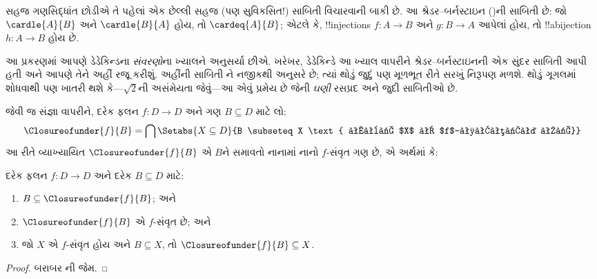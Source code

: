 \documentclass[../../../include/open-logic-section]{subfiles}
\begin{document}


સહજ ગણસિદ્ધાંત છોડીએ તે પહેલાં એક છેલ્લી સહજ (પણ સુવિકસિત!) સાબિતી
વિચારવાની બાકી છે. આ શ્રેડર--બર્નસ્ટાઇન
()ની સાબિતી છે: જો
$\cardle{A}{B}$ અને $\cardle{B}{A}$ હોય, તો $\cardeq{A}{B}$; એટલે કે,
!!{injection}s $f \colon A \to B$ અને $g \colon B \to A$ આપેલાં હોય,
તો !!a{bijection} $h \colon A \to B$ હોય છે.

આ પ્રકરણમાં આપણે ડેડેકિન્ડના \emph{સંવરણો}ના ખ્યાલને અનુસર્યા છીએ.
ખરેખર, ડેડેકિન્ડે આ ખ્યાલ વાપરીને શ્રેડર--બર્નસ્ટાઇનની એક સુંદર
સાબિતી આપી હતી અને આપણે તેને અહીં રજૂ કરીશું. અહીંની સાબિતી
\citet[pp.~157--8]{Potter2004}ને નજીકથી અનુસરે છે; ત્યાં થોડું જુદું
પણ મૂળભૂત રીતે સરખું નિરૂપણ મળશે. થોડું ગૂગલમાં
શોધવાથી પણ ખાતરી થશે કે---$\sqrt{2}$ની અસંમેયતા જેવું---આ એવું પ્રમેય
છે જેની \emph{ઘણી} રસપ્રદ અને જુદી સાબિતીઓ છે.

 જેવી જ સંજ્ઞા વાપરીને,
દરેક ફલન $f\colon D\to D$ અને ગણ $B\subseteq D$ માટે લો:
\[
\Closureofunder{f}{B} = \bigcap \Setabs{X\subseteq D}{B \subseteq X
\text{ અને $X$ એ $f$-સંવૃત છે}}
\]
આ રીતે વ્યાખ્યાયિત $\Closureofunder{f}{B}$ એ $B$ને સમાવતો નાનામાં
નાનો $f$-સંવૃત ગણ છે, એ અર્થમાં કે:

\begin{lem}
	દરેક ફલન $f\colon D\to D$ અને દરેક $B\subseteq D$ માટે:
	\begin{enumerate}
		\item{} $B \subseteq \Closureofunder{f}{B}$; અને
		\item{} $\Closureofunder{f}{B}$ એ $f$-સંવૃત છે; અને
		\item{} જો $X$ એ $f$-સંવૃત હોય અને $B
		\subseteq X$, તો $\Closureofunder{f}{B} \subseteq X$.
	\end{enumerate}
\end{lem}

\begin{proof}
બરાબર ની જેમ.
\end{proof}
\end{document}
